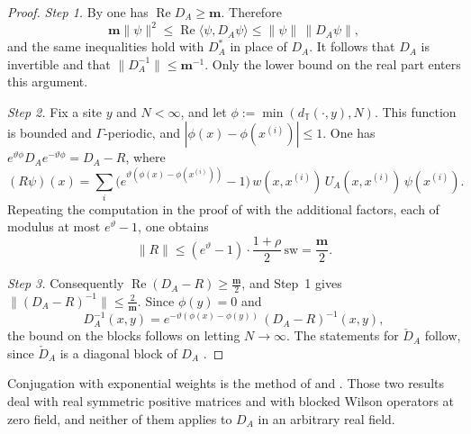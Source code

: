 \documentclass[11pt]{amsart}
\theoremstyle{definition}
\begin{document}
\begin{proof}
\emph{Step 1.}
By \cite[Proposition~3.18\,(b)]{QEDII} one has $\operatorname{Re}D_A\ge\mathbf m$.
Therefore
\begin{equation*}
\mathbf m\|\psi\|^2\le\operatorname{Re}\langle\psi,D_A\psi\rangle\le\|\psi\|\,\|D_A\psi\|,
\end{equation*}
and the same inequalities hold with $D_A^*$ in place of $D_A$.
It follows that $D_A$ is invertible and that $\|D_A^{-1}\|\le\mathbf m^{-1}$.
Only the lower bound on the real part enters this argument.

\emph{Step 2.}
Fix a site $y$ and $N<\infty$, and let $\phi:=\min(d_{\mathbb T}(\cdot,y),N)$.
This function is bounded and $\Gamma$-periodic, and $|\phi(x)-\phi(x^{(i)})|\le1$.
One has $e^{\vartheta\phi}D_Ae^{-\vartheta\phi}=D_A-R$, where
\begin{equation*}
(R\psi)(x)=\sum_i\bigl(e^{\vartheta(\phi(x)-\phi(x^{(i)}))}-1\bigr)\,w(x,x^{(i)})\,U_A(x,x^{(i)})\,\psi(x^{(i)}).
\end{equation*}
Repeating the computation in the proof of \cite[Proposition~3.18\,(c)]{QEDII} with the additional factors, each of modulus at most $e^{\vartheta}-1$, one obtains
\begin{equation*}
\|R\|\le(e^{\vartheta}-1)\cdot\frac{1+\rho}{2}\,\mathrm{sw}=\frac{\mathbf m}{2}.
\end{equation*}

\emph{Step 3.}
Consequently $\operatorname{Re}(D_A-R)\ge\frac{\mathbf m}{2}$, and Step~1 gives $\|(D_A-R)^{-1}\|\le\frac{2}{\mathbf m}$.
Since $\phi(y)=0$ and
\begin{equation*}
D_A^{-1}(x,y)=e^{-\vartheta(\phi(x)-\phi(y))}\,(D_A-R)^{-1}(x,y),
\end{equation*}
the bound on the blocks follows on letting $N\to\infty$.
The statements for $\check D_A$ follow, since $\check D_A$ is a diagonal block of $D_A$ \cite[Proposition~3.18\,(d)]{QEDII}.
\end{proof}

Conjugation with exponential weights is the method of \cite[Lemma~15.23]{QEDI} and \cite[Theorem~12.15]{QEDI}.
Those two results deal with real symmetric positive matrices and with blocked Wilson operators at zero field, and neither of them applies to $D_A$ in an arbitrary real field.
\end{document}
